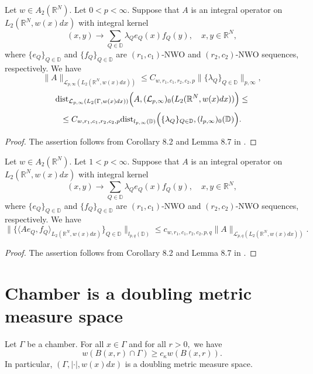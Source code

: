 \documentclass{amsart}
\begin{document}
\begin{lemma}\label{NWO lemma} Let $w\in A_2(\mathbb{R}^N).$ Let $0<p<\infty.$ Suppose that $A$ is an integral operator on $L_2(\mathbb{R}^N,w(x)dx)$ with integral kernel 
$$(x,y)\to \sum_{Q\in\mathbb{D}}\lambda_Q e_Q(x)f_Q(y),\quad x,y\in\mathbb{R}^N,$$
where $\{e_Q\}_{Q\in\mathbb{D}}$ and $\{f_Q\}_{Q\in\mathbb{D}}$ are $(r_1,c_1)$-NWO and $(r_2,c_2)$-NWO sequences, respectively. We have
$$\|A\|_{\mathcal{L}_{p,\infty}(L_2(\mathbb{R}^N,w(x)dx))}\leq C_{w,r_1,c_1,r_2,c_2,p} \|\{\lambda_Q\}_{Q\in\mathbb{D}}\|_{p,\infty},$$
$${\rm dist}_{\mathcal{L}_{p,\infty}(L_2(\Gamma,w(x)dx))}\Big(A,(\mathcal{L}_{p,\infty})_0(L_2(\mathbb{R}^N,w(x)dx))\Big)\leq $$
$$\leq C_{w,r_1,c_1,r_2,c_2,p}{\rm dist}_{l_{p,\infty}(\mathbb{D})}\Big(\{\lambda_Q\}_{Q\in\mathbb{D}},(l_{p,\infty})_0(\mathbb{D})\Big).$$
\end{lemma}
\begin{proof} The assertion follows from Corollary 8.2 and Lemma 8.7 in \cite{HKarxiv}.
\end{proof}

\begin{lemma}\label{NWO lower estimate} Let $w\in A_2(\mathbb{R}^N).$ Let $1<p<\infty.$ Suppose that $A$ is an integral operator on $L_2(\mathbb{R}^N,w(x)dx)$ with integral kernel 
$$(x,y)\to \sum_{Q\in\mathbb{D}}\lambda_Q e_Q(x)f_Q(y),\quad x,y\in\mathbb{R}^N,$$
where $\{e_Q\}_{Q\in\mathbb{D}}$ and $\{f_Q\}_{Q\in\mathbb{D}}$ are $(r_1,c_1)$-NWO and $(r_2,c_2)$-NWO sequences, respectively. We have
$$\Big\|\Big\{\langle A e_Q,f_Q \rangle_{L_2(\mathbb{R}^N,w(x)dx)}\Big\}_{Q\in\mathbb{D}}\Big\|_{l_{p,q}(\mathbb{D})}\leq c_{w,r_1,c_1,r_2,c_2,p,q}\|A\|_{\mathcal{L}_{p,q}(L_2(\mathbb{R}^N,w(x)dx))}.$$
\end{lemma}
\begin{proof} The assertion follows from Corollary 8.2 and Lemma 8.7 in \cite{HKarxiv}.
\end{proof}




\section{Chamber is a doubling metric measure space}

\begin{theorem}\label{main:dunkldoubling} Let $\Gamma$ be a chamber. For all $x\in\Gamma$ and for all $r>0,$ we have
$$w(B(x,r)\cap\Gamma)\geq c_{\kappa}w(B(x,r)).$$
In particular, $(\Gamma,|\cdot|,w(x)dx)$ is a doubling metric measure space.
\end{theorem}
\end{document}
